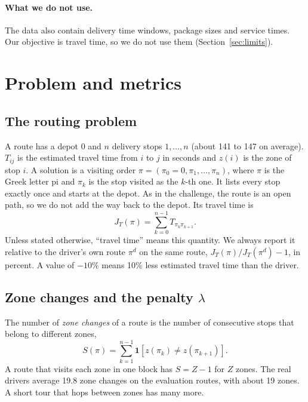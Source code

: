 \documentclass[11pt,a4paper]{article}
\newcommand{\JT}{J_T}
\begin{document}
\paragraph{What we do not use.} The data also contain delivery time windows, package sizes and service times. Our objective is travel time, so we do not use them (Section~\ref{sec:limits}).

\section{Problem and metrics}\label{sec:problem}
\subsection{The routing problem}
A route has a depot $0$ and $n$ delivery stops $1,\dots,n$ (about 141 to 147 on average). $T_{ij}$ is the estimated travel time from $i$ to $j$ in seconds and $z(i)$ is the zone of stop $i$. A solution is a visiting order $\pi=(\pi_0=0,\pi_1,\dots,\pi_n)$, where $\pi$ is the Greek letter pi and $\pi_k$ is the stop visited as the $k$-th one. It lists every stop exactly once and starts at the depot. As in the challenge, the route is an open path, so we do not add the way back to the depot. Its travel time is
\begin{equation}
\JT(\pi)=\sum_{k=0}^{n-1} T_{\pi_k\pi_{k+1}} .
\end{equation}
Unless stated otherwise, ``travel time'' means this quantity. We always report it relative to the driver's own route $\pi^d$ on the same route, $\JT(\pi)/\JT(\pi^d)-1$, in percent. A value of $-10\%$ means 10\% less estimated travel time than the driver.

\subsection{Zone changes and the penalty $\lambda$}
The number of \emph{zone changes} of a route is the number of consecutive stops that belong to different zones,
\begin{equation}
S(\pi)=\sum_{k=1}^{n-1}\mathbf 1\!\left[z(\pi_k)\neq z(\pi_{k+1})\right].
\end{equation}
A route that visits each zone in one block has $S=Z-1$ for $Z$ zones. The real drivers average 19.8 zone changes on the evaluation routes, with about 19 zones. A short tour that hops between zones has many more.
\end{document}
